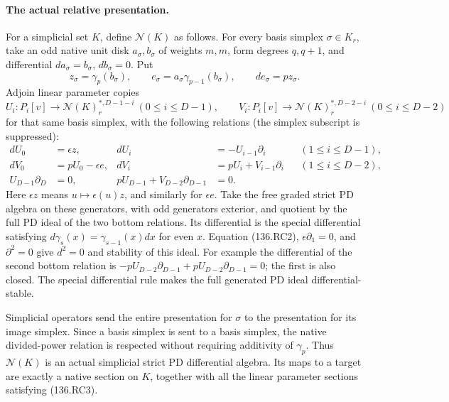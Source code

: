 \paragraph{The actual relative presentation.}
For a simplicial set \(K\), define \(\mathcal N(K)\) as follows.
For every basis simplex \(\sigma\in K_r\), take an odd native
unit disk \(a_\sigma,b_\sigma\) of weights \(m,m\), form
degrees \(q,q+1\), and differential
\(da_\sigma=b_\sigma\), \(db_\sigma=0\).
Put
\[
 z_\sigma=\gamma_p(b_\sigma),\qquad
 e_\sigma=a_\sigma\gamma_{p-1}(b_\sigma),\qquad
                         de_\sigma=pz_\sigma.           \tag{136.RC2}
\]
Adjoin linear parameter copies
\[
 U_i:P_i[v]\longrightarrow\mathcal N(K)_r^{*,D-1-i}
       \ (0\leq i\leq D-1),\qquad
 V_i:P_i[v]\longrightarrow\mathcal N(K)_r^{*,D-2-i}
       \ (0\leq i\leq D-2)
\]
for that same basis simplex, with the following relations (the
simplex subscript is suppressed):
\[
\begin{aligned}
 dU_0&=\epsilon z,&
 dU_i&=-U_{i-1}\partial_i &&(1\leq i\leq D-1),\\
 dV_0&=pU_0-\epsilon e,&
 dV_i&=pU_i+V_{i-1}\partial_i &&(1\leq i\leq D-2),\\
 U_{D-1}\partial_D&=0,&
 pU_{D-1}+V_{D-2}\partial_{D-1}&=0.
\end{aligned}                                             \tag{136.RC3}
\]
Here \(\epsilon z\) means \(u\mapsto\epsilon(u)z\),
and similarly for \(\epsilon e\). Take the free graded strict
PD algebra on these generators, with odd generators exterior,
and quotient by the full PD ideal of the two bottom relations.
Its differential is the special differential satisfying
\(d\gamma_s(x)=\gamma_{s-1}(x)dx\) for even \(x\).
Equation (136.RC2), \(\epsilon\partial_1=0\), and
\(\partial^2=0\) give \(d^2=0\) and stability of this
ideal. For example the differential of the second bottom relation
is \(-pU_{D-2}\partial_{D-1}+pU_{D-2}\partial_{D-1}=0\);
the first is also closed. The special differential rule makes
the full generated PD ideal differential-stable.

Simplicial operators send the entire presentation for \(\sigma\)
to the presentation for its image simplex. Since a basis simplex
is sent to a basis simplex, the native divided-power relation is
respected without requiring additivity of \(\gamma_p\).
Thus \(\mathcal N(K)\) is an actual simplicial strict PD
differential algebra. Its maps to a target are exactly a native
section on \(K\), together with all the linear parameter sections
satisfying (136.RC3).

